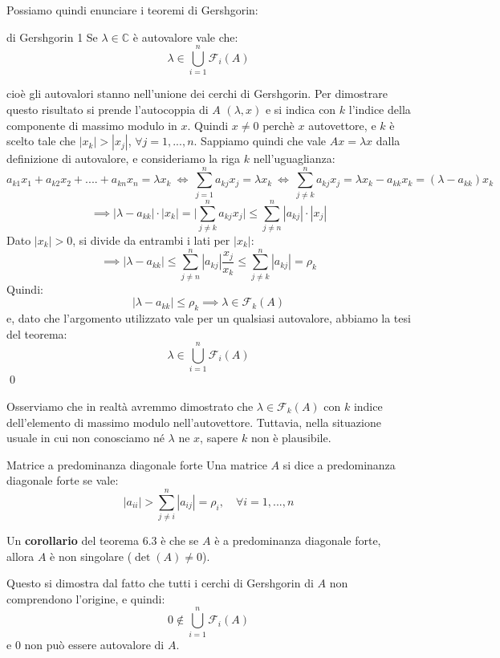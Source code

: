 \documentclass[a4paper,11pt]{article}
\begin{document}
Possiamo quindi enunciare i teoremi di Gershgorin:
\begin{theorem}{di Gershgorin 1}
	Se $\lambda \in \mathbb{C}$ è autovalore vale che:
	$$
	\lambda \in \bigcup_{i = 1}^n \mathcal{F}_i(A)
	$$
\end{theorem}
cioè gli autovalori stanno nell'unione dei cerchi di Gershgorin.
Per dimostrare questo risultato si prende l'autocoppia di $A$ $(\lambda, x)$ e si indica con $k$ l'indice della componente di massimo modulo in $x$.
Quindi $x \neq 0$ perchè $x$ autovettore, e $k$ è scelto tale che $|x_k| > |x_j|$, $\forall j = 1, ..., n$.
Sappiamo quindi che vale $Ax = \lambda x$ dalla definizione di autovalore, e consideriamo la riga $k$ nell'uguaglianza:
$$
a_{k1} x_1 + a_{k2} x_2 + .... + a_{kn} x_n = \lambda x_k \ \Leftrightarrow \ \sum_{j = 1}^n a_{kj} x_j = \lambda x_k \ \Leftrightarrow \ \sum_{j \neq k}^{n} a_{kj} x_j = \lambda x_k - a_{kk} x_k = (\lambda - a_{kk}) x_k
$$
$$
\implies |\lambda - a_{kk}| \cdot |x_k| = \Big| \sum_{j \neq k}^n a_{kj}x_j \Big| \leq \sum_{j \neq n}^n |a_{kj}| \cdot |x_j|
$$
Dato $|x_k| > 0$, si divide da entrambi i lati per $|x_k|$:
$$
\implies |\lambda - a_{kk}| \leq \sum_{j \neq n}^n |a_{kj}| \frac{x_j}{x_k} \leq \sum_{j \neq k}^n |a_{kj}| = \rho_k
$$
Quindi:
$$
|\lambda - a_{kk}| \leq \rho_k \implies \lambda \in \mathcal{F}_k(A)
$$
e, dato che l'argomento utilizzato vale per un qualsiasi autovalore, abbiamo la tesi del teorema:
$$
\lambda \in \bigcup_{i = 1}^n \mathcal{F}_i(A)
$$ \qed

Osserviamo che in realtà avremmo dimostrato che $\lambda \in \mathcal{F}_k(A)$ con $k$ indice dell'elemento di massimo modulo nell'autovettore.
Tuttavia, nella situazione usuale in cui non conosciamo né $\lambda$ ne $x$, sapere $k$ non è plausibile.

\begin{definition}{Matrice a predominanza diagonale forte}
	Una matrice $A$ si dice a predominanza diagonale forte se vale:
	$$
	|a_{ii}| > \sum_{j \neq i}^n |a_{ij}| = \rho_i, \quad \forall i = 1, ..., n
	$$
\end{definition}

Un \textbf{corollario} del teorema 6.3 è che se $A$ è a predominanza diagonale forte, allora $A$ è non singolare ($\det(A) \neq 0$).

Questo si dimostra dal fatto che tutti i cerchi di Gershgorin di $A$ non comprendono l'origine, e quindi:
$$
0 \not \in \bigcup_{i = 1}^n \mathcal{F}_i (A)
$$
e 0 non può essere autovalore di $A$.
\end{document}
